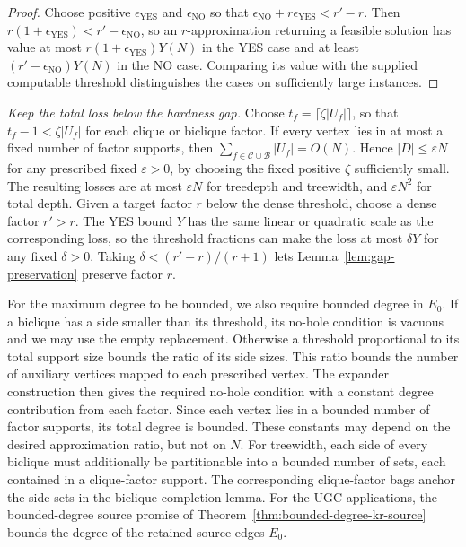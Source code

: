 \begin{proof}
Choose positive $\epsilon_{\mathrm{YES}}$ and $\epsilon_{\mathrm{NO}}$
so that $\epsilon_{\mathrm{NO}}+r\epsilon_{\mathrm{YES}}<r'-r$.
Then $r(1+\epsilon_{\mathrm{YES}})<r'-\epsilon_{\mathrm{NO}}$, so
an $r$-approximation returning a feasible solution has value at most
$r(1+\epsilon_{\mathrm{YES}})Y(N)$ in the YES case and at least
$(r'-\epsilon_{\mathrm{NO}})Y(N)$ in the NO case. Comparing its
value with the supplied computable threshold distinguishes the cases
on sufficiently large instances.
\end{proof}

\emph{Keep the total loss below the hardness gap.}
Choose $t_f=\lceil\zeta|U_f|\rceil$, so that
$t_f-1<\zeta|U_f|$ for each clique or biclique factor.
If every vertex lies in at most a fixed number
of factor supports, then
$\sum_{f\in\mathcal C\cup\mathcal B}|U_f|=O(N)$. Hence
$|D|\le\varepsilon N$ for any prescribed fixed
$\varepsilon>0$, by choosing the fixed positive $\zeta$ sufficiently small.
The resulting losses are at most $\varepsilon N$ for treedepth
and treewidth, and $\varepsilon N^2$ for total depth. Given a
target factor $r$ below the dense threshold, choose a dense factor
$r'>r$. The YES bound $Y$ has the same linear or quadratic scale
as the corresponding loss, so the threshold fractions can make
the loss at most $\delta Y$ for any fixed $\delta>0$. Taking
$\delta<(r'-r)/(r+1)$ lets Lemma~\ref{lem:gap-preservation}
preserve factor $r$.

For the maximum degree to be bounded, we also require bounded degree
in $E_0$. If a biclique has a side smaller than its threshold, its
no-hole condition is vacuous and we may use the empty replacement.
Otherwise a threshold proportional to its total support size bounds
the ratio of its side sizes. This ratio bounds the number of auxiliary
vertices mapped to each prescribed vertex. The expander construction then
gives the required no-hole condition with a constant degree
contribution from each factor. Since each vertex lies in a bounded number of
factor supports, its total degree is bounded. These constants may
depend on the desired approximation ratio, but not on $N$. For
treewidth, each
side of every biclique must additionally be partitionable into a
bounded number of sets, each contained in a clique-factor support.
The corresponding clique-factor bags anchor the side sets in the
biclique completion lemma.
For the UGC applications, the bounded-degree source promise of
Theorem~\ref{thm:bounded-degree-kr-source} bounds the degree of
the retained source edges $E_0$.

